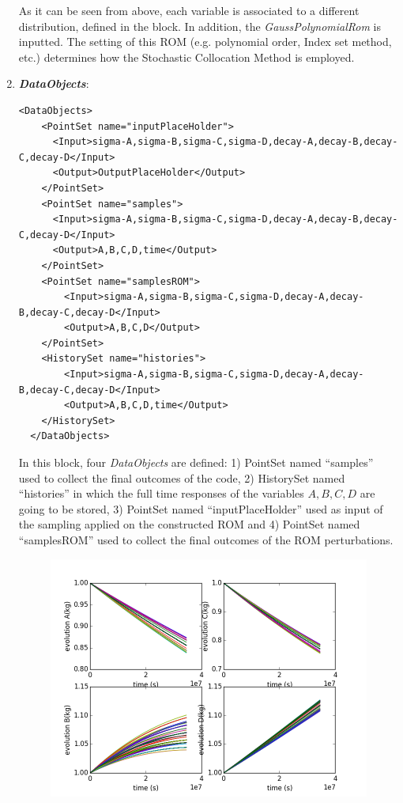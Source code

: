 \begin{enumerate}
  As it can be
  seen from above, each variable is associated to a different distribution,
  defined in the   block.
  In addition, the \textit{GaussPolynomialRom}   is inputted. The setting of this ROM (e.g. polynomial order, Index set method, etc.) determines how the Stochastic Collocation Method is 
  employed.
   \item \textbf{\textit{DataObjects}}:
\begin{lstlisting}[style=XML,morekeywords={arg,extension,pauseAtEnd,overwrite}]
  <DataObjects>
    <PointSet name="inputPlaceHolder">
      <Input>sigma-A,sigma-B,sigma-C,sigma-D,decay-A,decay-B,decay-C,decay-D</Input>
      <Output>OutputPlaceHolder</Output>
    </PointSet>
    <PointSet name="samples">
      <Input>sigma-A,sigma-B,sigma-C,sigma-D,decay-A,decay-B,decay-C,decay-D</Input>
      <Output>A,B,C,D,time</Output>
    </PointSet>
    <PointSet name="samplesROM">
        <Input>sigma-A,sigma-B,sigma-C,sigma-D,decay-A,decay-B,decay-C,decay-D</Input>
        <Output>A,B,C,D</Output>
    </PointSet>
    <HistorySet name="histories">
        <Input>sigma-A,sigma-B,sigma-C,sigma-D,decay-A,decay-B,decay-C,decay-D</Input>
        <Output>A,B,C,D,time</Output>
    </HistorySet>
  </DataObjects>
\end{lstlisting}
  In this block, four \textit{DataObjects} are defined: 1) PointSet named 
  ``samples'' used to collect the final outcomes of the code, 2) HistorySet named ``histories'' in which the full time responses of the variables $A,B,C,D$ are going to be stored, 3) PointSet named    
  ``inputPlaceHolder'' used as input of the sampling applied on the constructed ROM and 4) PointSet named ``samplesROM'' used to collect the final outcomes of the ROM perturbations.
 \begin{figure}[h!]
  \centering
  \includegraphics[scale=0.7]{pics/histories_SparseGrid.png}

\end{figure}
\end{enumerate}
